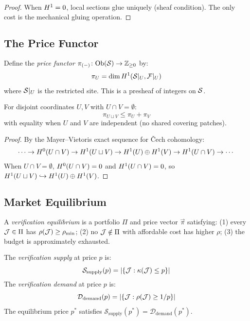 \documentclass[11pt]{article}
\newcommand{\TrustPrice}{\pi}
\newcommand{\VerifCost}{\kappa}
\newcommand{\TrustReturn}{\rho}
\newcommand{\Supply}{\mathcal{S}_{\mathrm{supply}}}
\newcommand{\Demand}{\mathcal{D}_{\mathrm{demand}}}
\begin{document}
\begin{proof}
When $H^{1} = 0$, local sections glue uniquely (sheaf condition).
The only cost is the mechanical gluing operation.
\end{proof}

\subsection{The Price Functor}

\begin{definition}\label{def:price-functor}
Define the \emph{price functor}
$\TrustPrice_{(-)} \colon \Ob(\Site) \to \mathbb{Z}_{\geq 0}$ by:
\[
  \TrustPrice_U = \dim \Hcoh{1}(\Site|_U, \mathcal{F}|_U)
\]
where $\mathcal{S}|_U$ is the restricted site.  This is a presheaf of
integers on $\mathcal{S}$.
\end{definition}

\begin{proposition}\label{prop:price-additive}
For disjoint coordinates $U, V$ with $U \cap V = \emptyset$:
\[
  \TrustPrice_{U \sqcup V} \leq \TrustPrice_U + \TrustPrice_V
\]
with equality when $U$ and $V$ are independent (no shared covering
patches).
\end{proposition}

\begin{proof}
By the Mayer--Vietoris exact sequence for \v{C}ech cohomology:
\[
  \cdots \to H^{0}(U \cap V) \to H^{1}(U \sqcup V) \to
  H^{1}(U) \oplus H^{1}(V) \to H^{1}(U \cap V) \to \cdots
\]
When $U \cap V = \emptyset$, $H^{0}(U \cap V) = 0$ and
$H^{1}(U \cap V) = 0$, so
$H^{1}(U \sqcup V) \hookrightarrow H^{1}(U) \oplus H^{1}(V)$.
\end{proof}

\subsection{Market Equilibrium}
\begin{definition}\label{def:equilibrium}
A \emph{verification equilibrium} is a portfolio $\Pi$ and price
vector $\vec{\TrustPrice}$ satisfying: (1) every $\mathcal{J} \in \Pi$ has
$\TrustReturn(\J) \geq \TrustReturn_{\min}$; (2) no $\mathcal{J} \notin \Pi$
with affordable cost has higher $\TrustReturn$; (3) the budget is
approximately exhausted.
\end{definition}

\begin{definition}\label{def:supply-demand}
The \emph{verification supply} at price $p$ is:
\[
  \Supply(p) = |\{\J : \VerifCost(\J) \leq p\}|
\]
The \emph{verification demand} at price $p$ is:
\[
  \Demand(p) = |\{\J : \TrustReturn(\J) \geq 1/p\}|
\]
The equilibrium price $p^*$ satisfies $\Supply(p^*) = \Demand(p^*)$.
\end{definition}
\end{document}

